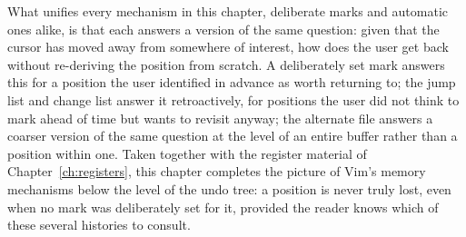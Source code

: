 What unifies every mechanism in this chapter, deliberate marks and automatic ones alike, is that each answers a version of the same question: given that the cursor has moved away from somewhere of interest, how does the user get back without re-deriving the position from scratch. A deliberately set mark answers this for a position the user identified in advance as worth returning to; the jump list and change list answer it retroactively, for positions the user did not think to mark ahead of time but wants to revisit anyway; the alternate file answers a coarser version of the same question at the level of an entire buffer rather than a position within one. Taken together with the register material of Chapter~\ref{ch:registers}, this chapter completes the picture of Vim's memory mechanisms below the level of the undo tree: a position is never truly lost, even when no mark was deliberately set for it, provided the reader knows which of these several histories to consult.
